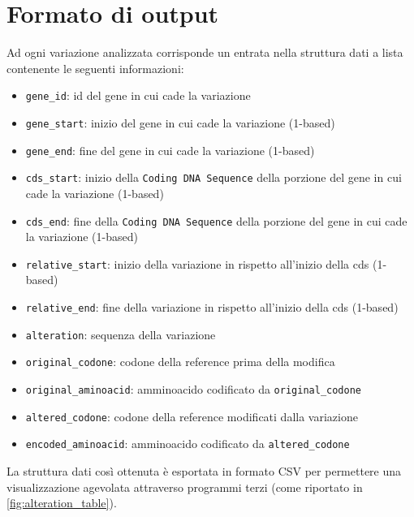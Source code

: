 \documentclass[11pt,italian]{article}
\begin{document}
\newpage
\section{Formato di output}
Ad ogni variazione analizzata corrisponde un entrata nella struttura dati a lista contenente le seguenti informazioni:
\begin{itemize}
    \item \lstinline{gene_id}: id del gene in cui cade la variazione
    \item \lstinline{gene_start}: inizio del gene in cui cade la variazione (1-based)
    \item \lstinline{gene_end}: fine del gene in cui cade la variazione (1-based)
    \item \lstinline{cds_start}: inizio della \lstinline{Coding DNA Sequence} della porzione del gene in cui cade la variazione (1-based)
    \item \lstinline{cds_end}: fine della \lstinline{Coding DNA Sequence} della porzione del gene in cui cade la variazione (1-based)
    \item \lstinline{relative_start}: inizio della variazione in rispetto all'inizio della cds (1-based)
    \item \lstinline{relative_end}: fine della variazione in rispetto all'inizio della cds (1-based)
    \item \lstinline{alteration}: sequenza della variazione
    \item \lstinline{original_codone}: codone della reference prima della modifica
    \item \lstinline{original_aminoacid}: amminoacido codificato da \lstinline{original_codone}
    \item \lstinline{altered_codone}: codone della reference modificati dalla variazione
    \item \lstinline{encoded_aminoacid}: amminoacido codificato da \lstinline{altered_codone}
\end{itemize}

\noindent
La struttura dati così ottenuta è esportata in formato CSV per permettere una visualizzazione agevolata attraverso programmi terzi (come riportato in \cref{fig:alteration_table}).
\end{document}
